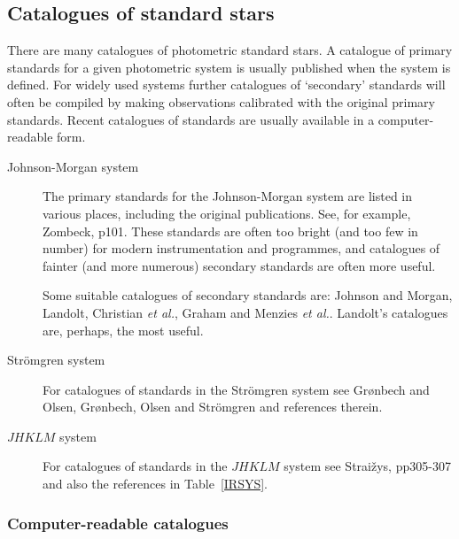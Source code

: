 \documentclass[twoside,11pt]{article}
\begin{document}
\subsection{\label{CATS}Catalogues of standard stars}

There are many catalogues of photometric standard stars.  A catalogue
of primary standards for a given photometric system is usually
published when the system is defined.  For widely used systems further
catalogues of `secondary' standards will often be compiled by making
observations calibrated with the original primary standards.  Recent
catalogues of standards are usually available in a computer-readable
form.

\begin{description}

  \item[Johnson-Morgan system] The primary standards for the Johnson-Morgan
   system are listed in various places, including the original publications.
   See, for example, Zombeck\cite{ZOMBECK90}, p101.  These standards are
   often too bright (and too few in number) for modern instrumentation and
   programmes, and catalogues of fainter (and more numerous) secondary
   standards are often more useful.

   Some suitable catalogues of secondary standards are:
   Johnson and Morgan\cite{JOHNSON53},
   Landolt\cite{LANDOLT73, LANDOLT83, LANDOLT83B, LANDOLT92},
   Christian {\it et al.}\/\cite{CHRISTIAN85},
   Graham\cite{GRAHAM82} and
   Menzies {\it et al.}\/\cite{MENZIES89, MENZIES91}.
   Landolt's catalogues are, perhaps, the most useful.


  \item[Str\"{o}mgren system] For catalogues of standards in the Str\"{o}mgren
   system see Gr\o nbech and Olsen\cite{GRONBECH77}, Gr\o nbech, Olsen and 
   Str\"{o}mgren\cite{GRONBECH76} and references therein.

  \item[$JHKLM$ system] For catalogues of standards in the $JHKLM$
   system see Strai\v{z}ys\cite{STRAIZYS92}, pp305-307 and also the
   references in Table~\ref{IRSYS}.

\end{description}

\subsubsection{Computer-readable catalogues}
\end{document}
